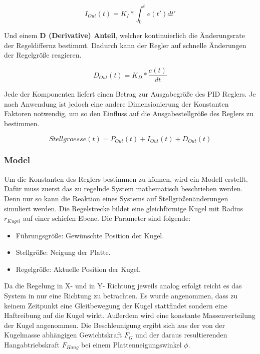 \documentclass[12pt,a4paper,bibliography=totoc,listof=totoc]{scrartcl}
\begin{document}
\begin{equation} 
I_{Out}(t) = K_I*\int_0^t e(t') dt'
\end{equation}

Und einem \textbf{D (Derivative) Anteil}, welcher kontinuierlich die Änderungsrate der Regeldiffernz bestimmt. Dadurch kann der Regler auf schnelle Änderungen der Regelgröße reagieren.

\begin{equation} 
D_{Out}(t) = K_D*\frac{e(t)}{dt}
\end{equation}

Jede der Komponenten liefert einen Betrag zur Ausgabegröße des PID Reglers. Je nach Anwendung ist jedoch eine andere Dimensionierung der Konstanten Faktoren notwendig, um so den Einfluss auf die Ausgabestellgröße des Reglers zu bestimmen.

\begin{equation} 
Stellgroesse(t) = P_{Out}(t) + I_{Out}(t) + D_{Out}(t)
\end{equation}

\subsubsection{Model}
Um die Konstanten des Reglers bestimmen zu können, wird ein Modell erstellt. Dafür muss zuerst das zu regelnde System mathematisch beschrieben werden. Denn nur so kann die Reaktion eines Systems auf Stellgrößenänderungen simuliert werden. Die Regelstrecke bildet eine gleichförmige Kugel mit Radius \(r_{Kugel}\) auf einer schiefen Ebene.
Die Parameter sind folgende:
\begin{itemize}
\item Führungsgröße: Gewünschte Position der Kugel.
\item Stellgröße: Neigung der Platte.
\item Regelgröße: Aktuelle Position der Kugel.
\end{itemize}

Da die Regelung in X- und in Y- Richtung jeweils analog erfolgt reicht es das System in nur eine Richtung zu betrachten. Es wurde angenommen, dass zu keinem Zeitpunkt eine Gleitbewegung der Kugel stattfindet sondern eine Haftreibung auf die Kugel wirkt. Außerdem wird eine konstante Massenverteilung der Kugel angenommen.
Die Beschleunigung ergibt sich aus der von der Kugelmasse abhängigen Gewichtskraft \(F_G\) und der daraus resultierenden Hangabtriebskraft \(F_{Hang}\) bei einem Plattenneigungswinkel \(\phi\).
\end{document}

